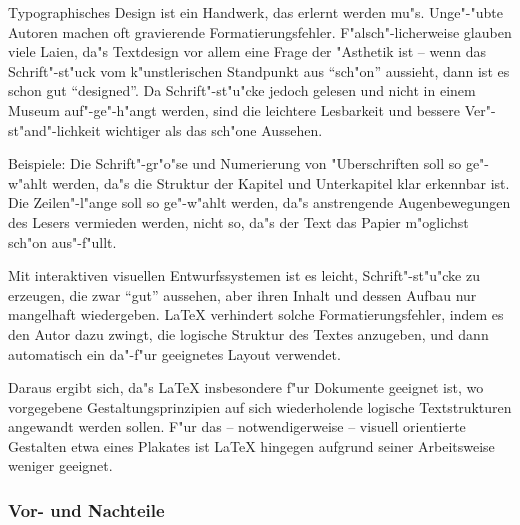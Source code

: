 Typographisches Design ist ein Handwerk, das erlernt werden mu"s.
Unge"-"ubte Autoren machen oft gravierende Formatierungsfehler.
F"alsch"-licherweise glauben viele Laien, da"s Textdesign
vor allem eine Frage der "Asthetik ist -- wenn das
Schrift"-st"uck vom k"unstlerischen Standpunkt aus "`sch"on"'
aussieht, dann ist es schon gut "`designed"'.
Da Schrift"-st"u"cke jedoch gelesen und nicht in einem Museum
auf"-ge"-h"angt werden, sind die leichtere Lesbarkeit und bessere
Ver"-st"and"-lichkeit wichtiger als das sch"one Aussehen.
 
Beispiele:
Die Schrift"-gr"o"se und Numerierung von "Uberschriften soll so
ge"-w"ahlt werden, da"s die Struktur der Kapitel und Unterkapitel
klar erkennbar ist.
Die Zeilen"-l"ange soll so ge"-w"ahlt werden, da"s anstrengende
Augenbewegungen des Lesers vermieden werden, nicht so, da"s der
Text das Papier m"oglichst sch"on aus"-f"ullt.
 
Mit interaktiven visuellen Entwurfssystemen ist es leicht,  
Schrift"-st"u"cke zu erzeugen, die zwar "`gut"' aussehen,
aber ihren Inhalt und dessen Aufbau nur mangelhaft wiedergeben.
\LaTeX{} verhindert solche
Formatierungsfehler, indem es den Autor dazu zwingt, die logische
Struktur des Textes anzugeben, und dann automatisch ein da"-f"ur
geeignetes Layout verwendet.

Daraus ergibt sich, da"s \LaTeX{} insbesondere f"ur  Dokumente geeignet 
ist, wo vorgegebene Gestaltungsprinzipien auf sich wiederholende
logische Textstrukturen angewandt werden sollen. 
F"ur das -- notwendigerweise -- visuell orientierte Gestalten
etwa eines Plakates ist \LaTeX{} hingegen 
aufgrund seiner Arbeitsweise weniger geeignet.

\subsubsection{Vor- und Nachteile}

